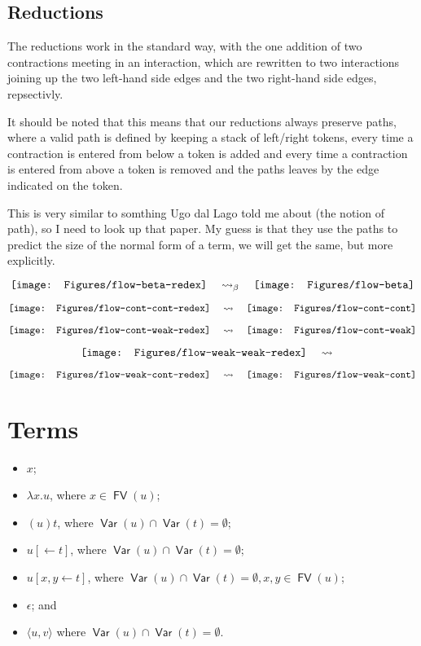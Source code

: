 \documentclass[11pt,a4paper]{article}
\theoremstyle{definition}
\theoremstyle{plain}
\theoremstyle{remark}
\begin{document}
\subsection{Reductions}

The reductions work in the standard way, with the one addition of two contractions meeting in an interaction, which are rewritten to two interactions joining up the two left-hand side edges and the two right-hand side edges, repsectivly.

It should be noted that this means that our reductions always preserve paths, where a valid path is defined by keeping a stack of left/right tokens, every time a contraction is entered from below a token is added and every time a contraction is entered from above a token is removed and the paths leaves by the edge indicated on the token.

This is very similar to somthing Ugo dal Lago told me about (the notion of path), so I need to look up that paper. My guess is that they use the paths to predict the size of the normal form of a term, we will get the same, but more explicitly.

\[
\vcenter{\hbox{\texttt{[image: Figures/flow-beta-redex]}}}
\quad\rightsquigarrow_\beta\quad
\vcenter{\hbox{\texttt{[image: Figures/flow-beta]}}}
\]

\[
\vcenter{\hbox{\texttt{[image: Figures/flow-cont-cont-redex]}}}
\quad\rightsquigarrow\quad
\vcenter{\hbox{\texttt{[image: Figures/flow-cont-cont]}}}
\]

\[
\vcenter{\hbox{\texttt{[image: Figures/flow-cont-weak-redex]}}}
\quad\rightsquigarrow\quad
\vcenter{\hbox{\texttt{[image: Figures/flow-cont-weak]}}}
\]

\[
\vcenter{\hbox{\texttt{[image: Figures/flow-weak-weak-redex]}}}
\quad\rightsquigarrow\quad
\]

\[
\vcenter{\hbox{\texttt{[image: Figures/flow-weak-cont-redex]}}}
\quad\rightsquigarrow\quad
\vcenter{\hbox{\texttt{[image: Figures/flow-weak-cont]}}}
\]

\section{Terms}

\newcommand{\FV}{{\mathop{\mathsf{FV}}}}
\newcommand{\Var}{{\mathop{\mathsf{Var}}}}
\newcommand{\terpair}[2]{{\langle{#1},{#2}\rangle}}
\newcommand{\terdel}[1]{{[\leftarrow{#1}]}}
\newcommand{\terdup}[3]{{[{#1},{#2}\leftarrow{#3}]}}

\begin{itemize}
	\item $x$;
	\item $\lambda x.u$, where $x\in\FV(u)$;
	\item $(u)t$, where $\Var(u)\cap\Var(t)=\emptyset$;
	\item $u\terdel{t}$, where $\Var(u)\cap\Var(t)=\emptyset$;
	\item $u\terdup{x}{y}{t}$, where $\Var(u)\cap\Var(t)=\emptyset, x,y\in\FV(u)$;
	\item $\epsilon$; and
	\item $\terpair{u}{v}$ where $\Var(u)\cap\Var(t)=\emptyset$.
\end{itemize}
\end{document}
